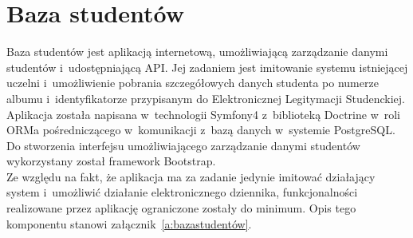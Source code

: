 \documentclass[declaration,shortabstract, mgr]{iithesis}
\begin{document}
\section{Baza studentów}
\indent Baza studentów jest aplikacją internetową, umożliwiającą zarządzanie danymi studentów i~udostępniającą API. Jej zadaniem jest imitowanie systemu istniejącej uczelni i~umożliwienie pobrania szczegółowych danych studenta po numerze albumu i~identyfikatorze przypisanym do Elektronicznej Legitymacji Studenckiej.\\
\indent Aplikacja została napisana w~technologii Symfony4\cite{symfony} z~biblioteką Doctrine\cite{doctrine} w~roli ORMa pośredniczącego w~komunikacji z~bazą danych w~systemie PostgreSQL. Do stworzenia interfejsu umożliwiającego zarządzanie danymi studentów wykorzystany został framework Bootstrap.\\
\indent Ze względu na fakt, że aplikacja ma za zadanie jedynie imitować działający system i~umożliwić działanie elektronicznego dziennika, funkcjonalności realizowane przez aplikację ograniczone zostały do minimum. Opis tego komponentu stanowi załącznik~\ref{a:bazastudentów}.
\end{document}
